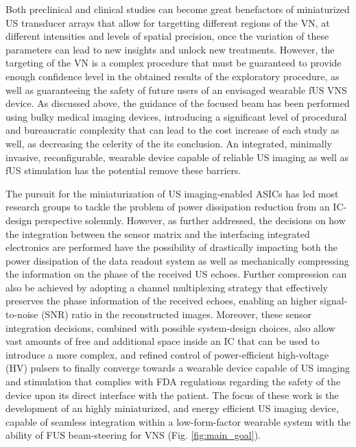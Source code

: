 Both preclinical and clinical studies can become great benefactors of miniaturized US transducer arrays that allow for targetting different regions of the VN, at different intensities and levels of spatial precision, once the variation of these parameters can lead to new insights and unlock new treatments. However, the targeting of the VN is a complex procedure that must be guaranteed to provide enough confidence level in the obtained results of the exploratory procedure, as well as guaranteeing the safety of future users of an envisaged wearable fUS VNS device. As discussed above, the guidance of the focused beam has been performed using bulky medical imaging devices, introducing a significant level of procedural and bureaucratic complexity that can lead to the cost increase of each study as well, as decreasing the celerity of the its conclusion. An integrated, minimally invasive, reconfigurable, wearable device capable of reliable US imaging as well as fUS stimulation has the potential remove these barriers.

\par
The pursuit for the miniaturization of US imaging-enabled ASICs has led most research groups to tackle the problem of power dissipation reduction from an IC-design perspective solemnly. However, as further addressed, the decisions on how the integration between the sensor matrix and the interfacing integrated electronics are performed have the possibility of drastically impacting both the power dissipation of the data readout system as well as mechanically compressing the information on the phase of the received US echoes. Further compression can also be achieved by adopting a channel multiplexing strategy that effectively preserves the phase information of the received echoes, enabling an higher signal-to-noise (SNR) ratio in the reconstructed images. Moreover, these sensor integration decisions, combined with possible system-design choices, also allow vast amounts of free and additional space inside an IC that can be used to introduce a more complex, and refined control of power-efficient high-voltage (HV) pulsers to finally converge towards a wearable device capable of US imaging and stimulation that complies with FDA regulations regarding the safety of the device upon its direct interface with the patient. The focus of these work is the development of an highly miniaturized, and energy efficient US imaging device, capable of seamless integration within a low-form-factor wearable system with the ability of FUS beam-steering for VNS (Fig. \ref{fig:main_goal}). 


